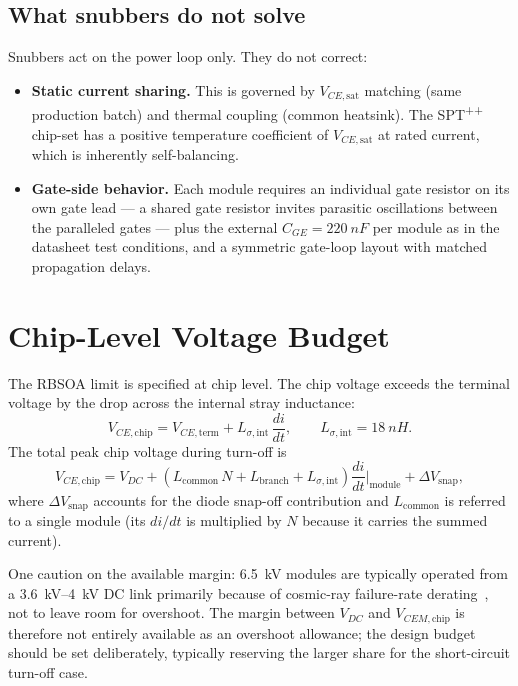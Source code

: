 \documentclass[11pt,a4paper]{article}
\begin{document}
\subsection{What snubbers do not solve}
Snubbers act on the power loop only. They do not correct:
\begin{itemize}
\item \textbf{Static current sharing.} This is governed by $V_{CE,\mathrm{sat}}$
matching (same production batch) and thermal coupling (common heatsink). The
SPT\textsuperscript{++} chip-set has a positive temperature coefficient of
$V_{CE,\mathrm{sat}}$ at rated current, which is inherently self-balancing.
\item \textbf{Gate-side behavior.} Each module requires an individual gate resistor
on its own gate lead --- a shared gate resistor invites parasitic oscillations between
the paralleled gates --- plus the external $C_{GE} = \SI{220}{nF}$ per module as in the
datasheet test conditions, and a symmetric gate-loop layout with matched propagation
delays.
\end{itemize}

\section{Chip-Level Voltage Budget}
The RBSOA limit is specified at chip level. The chip voltage exceeds the terminal
voltage by the drop across the internal stray inductance:
\begin{equation}
V_{CE,\mathrm{chip}} = V_{CE,\mathrm{term}} + L_{\sigma,\mathrm{int}}\,\frac{di}{dt},
\qquad L_{\sigma,\mathrm{int}} = \SI{18}{nH}.
\end{equation}
The total peak chip voltage during turn-off is
\begin{equation}
V_{CE,\mathrm{chip}} = V_{DC}
+ \left(L_{\mathrm{common}}\,N + L_{\mathrm{branch}} + L_{\sigma,\mathrm{int}}\right)
\frac{di}{dt}\bigg|_{\mathrm{module}}
+ \Delta V_{\mathrm{snap}},
\label{eq:budget}
\end{equation}
where $\Delta V_{\mathrm{snap}}$ accounts for the diode snap-off contribution and
$L_{\mathrm{common}}$ is referred to a single module (its $di/dt$ is multiplied by $N$
because it carries the summed current).

One caution on the available margin: \SI{6.5}{kV} modules are typically operated from
a \SIrange{3.6}{4}{kV} DC link primarily because of cosmic-ray failure-rate
derating~\cite{an2042}, not to leave room for overshoot. The margin between $V_{DC}$
and $V_{CEM,\mathrm{chip}}$ is therefore not entirely available as an overshoot
allowance; the design budget should be set deliberately, typically reserving the
larger share for the short-circuit turn-off case.
\end{document}
